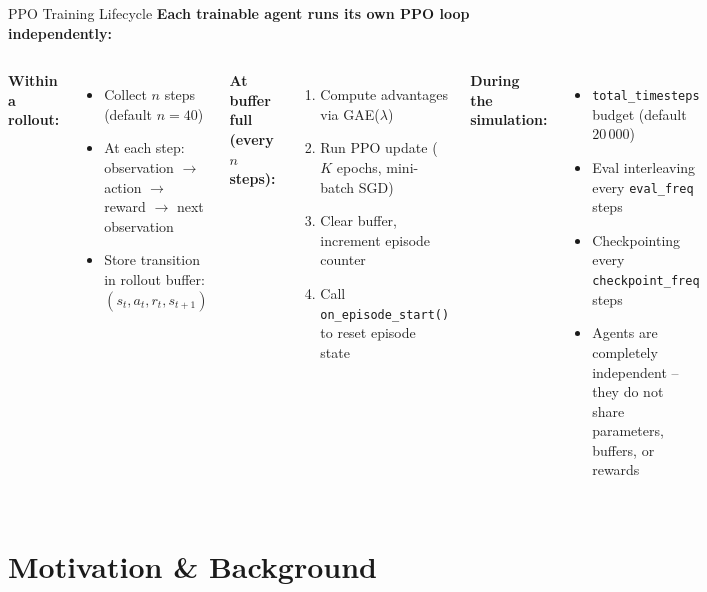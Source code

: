 \documentclass[10pt,aspectratio=169]{beamer}
\begin{document}
\begin{frame}{PPO Training Lifecycle}
  \textbf{Each trainable agent runs its own PPO loop independently:}

  \vspace{6pt}
  \begin{columns}[T]
    \textbf{Within a rollout:}
    \begin{itemize}
      \item Collect $n$ steps (default $n = 40$)
      \item At each step: observation $\rightarrow$ action $\rightarrow$ reward $\rightarrow$ next observation
      \item Store transition in rollout buffer: $(s_t, a_t, r_t, s_{t+1})$
    \end{itemize}

    \vspace{4pt}
    \textbf{At buffer full (every $n$ steps):}
    \begin{enumerate}
      \item Compute advantages via GAE($\lambda$)
      \item Run PPO update ($K$ epochs, mini-batch SGD)
      \item Clear buffer, increment episode counter
      \item Call \texttt{on\_episode\_start()} to reset episode state
    \end{enumerate}

    \textbf{During the simulation:}
    \begin{itemize}
      \item \texttt{total\_timesteps} budget (default $20\,000$)
      \item Eval interleaving every \texttt{eval\_freq} steps
      \item Checkpointing every \texttt{checkpoint\_freq} steps
      \item Agents are completely independent -- they do not share parameters, buffers, or rewards
    \end{itemize}
  \end{columns}
\end{frame}

\section{Motivation \& Background}
\end{document}
